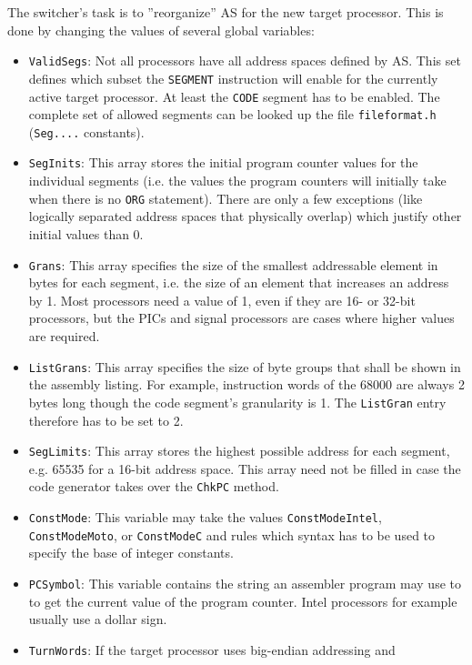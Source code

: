 \documentclass[12pt,twoside]{report}
\newcommand{\tty}[1]{{\tt #1}}
\begin{document}
The switcher's task is to ''reorganize'' AS for the new target
processor.  This is done by changing the values of several global
variables:
\begin{itemize}
\item{\tty{ValidSegs}: Not all processors have all address spaces defined
      by AS.  This set defines which subset the \tty{SEGMENT} instruction
      will enable for the currently active target processor.  At least the
      \tty{CODE} segment has to be enabled.  The complete set of allowed
      segments can be looked up the file \tty{fileformat.h} (\tty{Seg....}
      constants).}
\item{\tty{SegInits}: This array stores the initial program counter values
      for the individual segments (i.e. the values the program counters
      will initially take when there is no \tty{ORG} statement).  There are 
      only a few exceptions (like logically separated address spaces
      that physically overlap) which justify other initial values than
      0.}
\item{\tty{Grans}: This array specifies the size of the smallest addressable
      element in bytes for each segment, i.e. the size of an element
      that increases an address by 1.  Most processors need a value of
      1, even if they are 16- or 32-bit processors, but the PICs and
      signal processors are cases where higher values are required.}
\item{\tty{ListGrans}: This array specifies the size of byte groups that shall
      be shown in the assembly listing.  For example, instruction words
      of the 68000 are always 2 bytes long though the code segment's
      granularity is 1.  The \tty{ListGran} entry therefore has to be set to
      2.}
\item{\tty{SegLimits}: This array stores the highest possible address for
      each segment, e.g. 65535 for a 16-bit address space.  This array
      need not be filled in case the code generator takes over the 
      {\tt ChkPC} method.}
\item{\tty{ConstMode}: This variable may take the values
      \tty{ConstModeIntel}, \tty{ConstModeMoto}, or \tty{ConstModeC}
      and rules which syntax has to be used to specify the base of
      integer constants.}
\item{\tty{PCSymbol}: This variable contains the string an assembler program
      may use to to get the current value of the program counter. 
      Intel processors for example usually use a dollar sign.}
\item{\tty{TurnWords}: If the target processor uses big-endian addressing and
}
\end{itemize}
\end{document}
